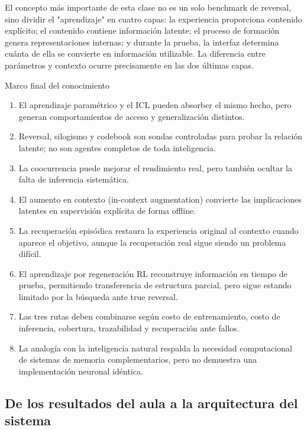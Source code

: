 \documentclass[a4paper]{article}
\begin{document}
El concepto más importante de esta clase no es un solo benchmark de reversal, sino dividir el "aprendizaje" en cuatro capas: la experiencia proporciona contenido explícito; el contenido contiene información latente; el proceso de formación genera representaciones internas; y durante la prueba, la interfaz determina cuánta de ella se convierte en información utilizable. La diferencia entre parámetros y contexto ocurre precisamente en las dos últimas capas.

\begin{importantbox}{Marco final del conocimiento}
\begin{enumerate}
  \item El aprendizaje paramétrico y el ICL pueden absorber el mismo hecho, pero generan comportamientos de acceso y generalización distintos.
  \item Reversal, silogismo y codebook son sondas controladas para probar la relación latente; no son agentes completos de toda inteligencia.
  \item La coocurrencia puede mejorar el rendimiento real, pero también ocultar la falta de inferencia sistemática.
  \item El aumento en contexto (in-context augmentation) convierte las implicaciones latentes en supervisión explícita de forma offline.
  \item La recuperación episódica restaura la experiencia original al contexto cuando aparece el objetivo, aunque la recuperación real sigue siendo un problema difícil.
  \item El aprendizaje por regeneración RL reconstruye información en tiempo de prueba, permitiendo transferencia de estructura parcial, pero sigue estando limitado por la búsqueda ante true reversal.
  \item Las tres rutas deben combinarse según costo de entrenamiento, costo de inferencia, cobertura, trazabilidad y recuperación ante fallos.
  \item La analogía con la inteligencia natural respalda la necesidad computacional de sistemas de memoria complementarios, pero no demuestra una implementación neuronal idéntica.
\end{enumerate}
\end{importantbox}

\subsection{De los resultados del aula a la arquitectura del sistema}
\end{document}
